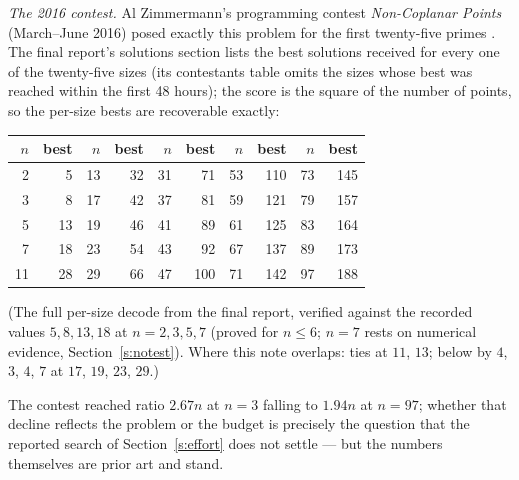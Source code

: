 \documentclass[11pt,a4paper]{article}
\begin{document}
\emph{The 2016 contest.}  Al Zimmermann's programming contest \emph{Non-Coplanar Points}
(March--June 2016) posed exactly this problem for the first twenty-five primes \cite{AZsPCs}.
The final report's solutions section lists the best solutions received for every one of the twenty-five
sizes (its contestants table omits the sizes whose best was reached within the first 48 hours); the
score is the square of the number of points, so the per-size bests are recoverable exactly:
\begin{center}
\begin{tabular}{rr|rr|rr|rr|rr}
\toprule
$n$ & best & $n$ & best & $n$ & best & $n$ & best & $n$ & best\\
\midrule
 2 &   5 & 13 &  32 & 31 &  71 & 53 & 110 & 73 & 145\\
 3 &   8 & 17 &  42 & 37 &  81 & 59 & 121 & 79 & 157\\
 5 &  13 & 19 &  46 & 41 &  89 & 61 & 125 & 83 & 164\\
 7 &  18 & 23 &  54 & 43 &  92 & 67 & 137 & 89 & 173\\
11 &  28 & 29 &  66 & 47 & 100 & 71 & 142 & 97 & 188\\
\bottomrule
\end{tabular}

\smallskip
{\small (The full per-size decode from the final report, verified against the recorded values $5,8,13,18$
at $n=2,3,5,7$ (proved for $n\le6$; $n=7$ rests on numerical evidence, Section~\ref{s:notest}).  Where this note overlaps: ties at $11$, $13$; below by $4$, $3$, $4$, $7$ at $17$, $19$,
$23$, $29$.)}
\end{center}
The contest reached ratio $2.67n$ at $n=3$ falling to $1.94n$ at $n=97$; whether that decline
reflects the problem or the budget is precisely the question that the reported search of Section~\ref{s:effort}
does not settle --- but the numbers themselves are prior art and stand.
\end{document}
